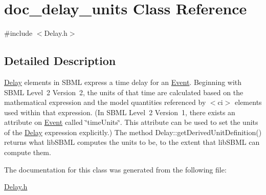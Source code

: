\hypertarget{classdoc__delay__units}{}\section{doc\+\_\+delay\+\_\+units Class Reference}
\label{classdoc__delay__units}


{\ttfamily \#include $<$Delay.\+h$>$}



\subsection{Detailed Description}
\begin{DoxyParagraph}{}
\hyperlink{class_delay}{Delay} elements in S\+B\+ML express a time delay for an \hyperlink{class_event}{Event}. Beginning with S\+B\+ML Level~2 Version~2, the units of that time are calculated based on the mathematical expression and the model quantities referenced by {\ttfamily $<$ci$>$} elements used within that expression. (In S\+B\+ML Level~2 Version~1, there exists an attribute on \hyperlink{class_event}{Event} called \char`\"{}time\+Units\char`\"{}. This attribute can be used to set the units of the \hyperlink{class_delay}{Delay} expression explicitly.) The method Delay\+::get\+Derived\+Unit\+Definition() returns what lib\+S\+B\+ML computes the units to be, to the extent that lib\+S\+B\+ML can compute them. 
\end{DoxyParagraph}


The documentation for this class was generated from the following file\+:\begin{DoxyCompactItemize}
\item 
\hyperlink{_delay_8h}{Delay.\+h}\end{DoxyCompactItemize}
